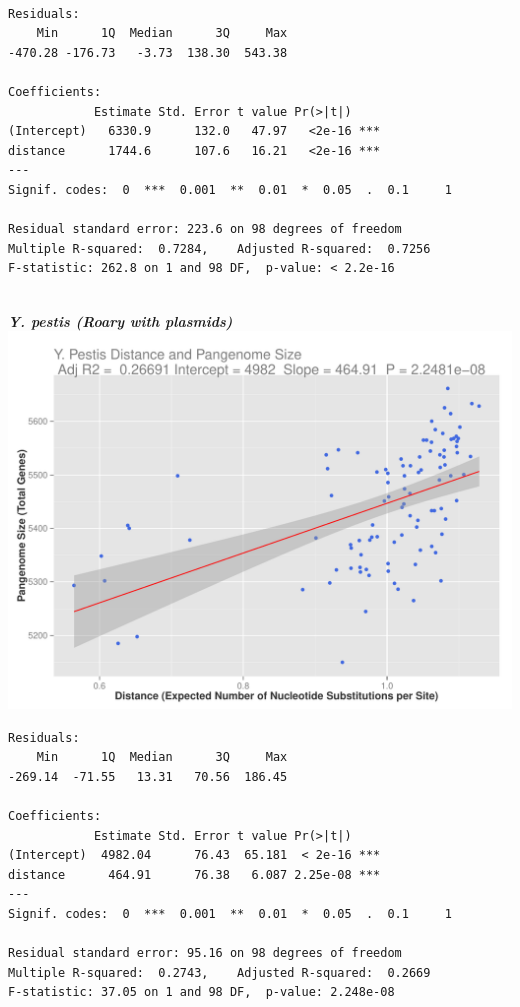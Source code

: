 \documentclass[12pt]{article}
\begin{document}
\begin{lstlisting}

Residuals:
    Min      1Q  Median      3Q     Max 
-470.28 -176.73   -3.73  138.30  543.38 

Coefficients:
            Estimate Std. Error t value Pr(>|t|)    
(Intercept)   6330.9      132.0   47.97   <2e-16 ***
distance      1744.6      107.6   16.21   <2e-16 ***
---
Signif. codes:  0  ***  0.001  **  0.01  *  0.05  .  0.1     1

Residual standard error: 223.6 on 98 degrees of freedom
Multiple R-squared:  0.7284,    Adjusted R-squared:  0.7256 
F-statistic: 262.8 on 1 and 98 DF,  p-value: < 2.2e-16


\end{lstlisting}

\newpage

{\large \textbf{\textit{Y. pestis (Roary with plasmids)}}\\}
\includegraphics[width=\textwidth]{pestisplot.pdf}

\begin{lstlisting}
Residuals:
    Min      1Q  Median      3Q     Max 
-269.14  -71.55   13.31   70.56  186.45 

Coefficients:
            Estimate Std. Error t value Pr(>|t|)    
(Intercept)  4982.04      76.43  65.181  < 2e-16 ***
distance      464.91      76.38   6.087 2.25e-08 ***
---
Signif. codes:  0  ***  0.001  **  0.01  *  0.05  .  0.1     1

Residual standard error: 95.16 on 98 degrees of freedom
Multiple R-squared:  0.2743,    Adjusted R-squared:  0.2669 
F-statistic: 37.05 on 1 and 98 DF,  p-value: 2.248e-08
\end{lstlisting}
\end{document}
